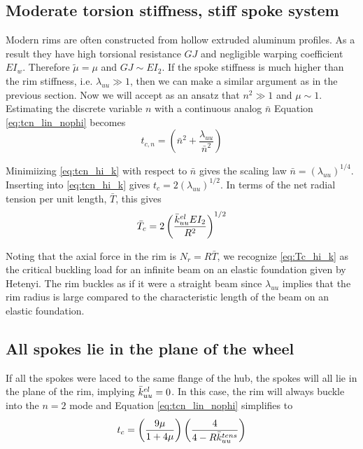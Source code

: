 \documentclass[\rootdir/thesis.tex]{subfiles}
\begin{document}
\subsection{Moderate torsion stiffness, stiff spoke system}
Modern rims are often constructed from hollow extruded aluminum profiles. As a result they have high torsional resistance $GJ$ and negligible warping coefficient $EI_w$. Therefore $\tilde{\mu} = \mu$ and $GJ \sim EI_2$. If the spoke stiffness is much higher than the rim stiffness, i.e. $\lambda_{uu} \gg 1$, then we can make a similar argument as in the previous section. Now we will accept as an ansatz that $n^2 \gg 1$ and $\mu \sim 1$. Estimating the discrete variable $n$ with a continuous analog $\bar{n}$ Equation \eqref{eq:tcn_lin_nophi} becomes
\begin{equation}
\label{eq:tcn_hi_k}
t_{c,n} = \left(\bar{n}^2 + \frac{\lambda_{uu}}{\bar{n}^2}\right)
\end{equation}

Minimiizing \eqref{eq:tcn_hi_k} with respect to $\bar{n}$ gives the scaling law $\bar{n}=(\lambda_{uu})^{1/4}$. Inserting into \eqref{eq:tcn_hi_k} gives $t_c = 2(\lambda_{uu})^{1/2}$. In terms of the net radial tension per unit length, $\bar{T}$, this gives
\begin{equation}
\label{eq:Tc_hi_k}
\bar{T}_c = 2 \left(\frac{\bar{k}_{uu}^{el}EI_2}{R^2}\right)^{1/2}
\end{equation}

Noting that the axial force in the rim is $N_r=R\bar{T}$, we recognize \eqref{eq:Tc_hi_k} as the critical buckling load for an infinite beam on an elastic foundation given by Hetenyi\cite{Hetenyi}. The rim buckles as if it were a straight beam since $\lambda_{uu}$ implies that the rim radius is large compared to the characteristic length of the beam on an elastic foundation.

\subsection{All spokes lie in the plane of the wheel}

If all the spokes were laced to the same flange of the hub, the spokes will all lie in the plane of the rim, implying $\bar{k}_{uu}^{el}=0$. In this case, the rim will always buckle into the $n=2$ mode and Equation \eqref{eq:tcn_lin_nophi} simplifies to
\begin{equation}
t_c = \left(\frac{9\mu}{1 + 4\mu}\right)\left(\frac{4}{4 - R\bar{k}_{uu}^{tens}}\right)
\end{equation}
\end{document}
